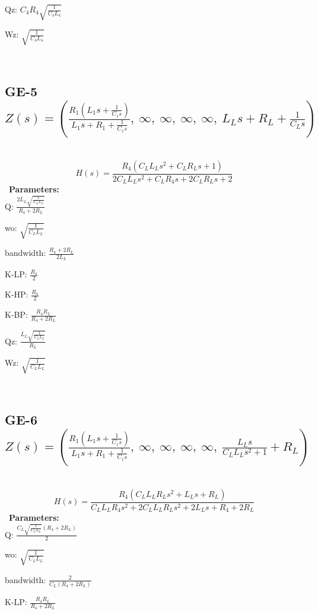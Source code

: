 \documentclass{article}
\begin{document}
Qz: $C_{4} R_{4} \sqrt{\frac{1}{C_{4} L_{4}}}$\ 

Wz: $\sqrt{\frac{1}{C_{4} L_{4}}}$\ 

\ 

\subsection{GE-5 $Z(s) = \left( \frac{R_{1} \left(L_{1} s + \frac{1}{C_{1} s}\right)}{L_{1} s + R_{1} + \frac{1}{C_{1} s}}, \  \infty, \  \infty, \  \infty, \  \infty, \  L_{L} s + R_{L} + \frac{1}{C_{L} s}\right)$ } \ 
\textbf{\[H(s) = \frac{R_{4} \left(C_{L} L_{L} s^{2} + C_{L} R_{L} s + 1\right)}{2 C_{L} L_{L} s^{2} + C_{L} R_{4} s + 2 C_{L} R_{L} s + 2}\] } \ 
\textbf{Parameters:}\\ 

Q: $\frac{2 L_{L} \sqrt{\frac{1}{C_{L} L_{L}}}}{R_{4} + 2 R_{L}}$\ 

wo: $\sqrt{\frac{1}{C_{L} L_{L}}}$\ 

bandwidth: $\frac{R_{4} + 2 R_{L}}{2 L_{L}}$\ 

K-LP: $\frac{R_{4}}{2}$\ 

K-HP: $\frac{R_{4}}{2}$\ 

K-BP: $\frac{R_{4} R_{L}}{R_{4} + 2 R_{L}}$\ 

Qz: $\frac{L_{L} \sqrt{\frac{1}{C_{L} L_{L}}}}{R_{L}}$\ 

Wz: $\sqrt{\frac{1}{C_{L} L_{L}}}$\ 

\ 

\subsection{GE-6 $Z(s) = \left( \frac{R_{1} \left(L_{1} s + \frac{1}{C_{1} s}\right)}{L_{1} s + R_{1} + \frac{1}{C_{1} s}}, \  \infty, \  \infty, \  \infty, \  \infty, \  \frac{L_{L} s}{C_{L} L_{L} s^{2} + 1} + R_{L}\right)$ } \ 
\textbf{\[H(s) = \frac{R_{4} \left(C_{L} L_{L} R_{L} s^{2} + L_{L} s + R_{L}\right)}{C_{L} L_{L} R_{4} s^{2} + 2 C_{L} L_{L} R_{L} s^{2} + 2 L_{L} s + R_{4} + 2 R_{L}}\] } \ 
\textbf{Parameters:}\\ 

Q: $\frac{C_{L} \sqrt{\frac{1}{C_{L} L_{L}}} \left(R_{4} + 2 R_{L}\right)}{2}$\ 

wo: $\sqrt{\frac{1}{C_{L} L_{L}}}$\ 

bandwidth: $\frac{2}{C_{L} \left(R_{4} + 2 R_{L}\right)}$\ 

K-LP: $\frac{R_{4} R_{L}}{R_{4} + 2 R_{L}}$\ 
\end{document}

